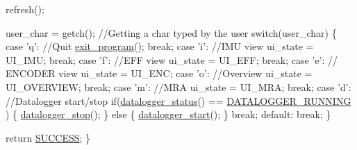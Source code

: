 \begin{DoxyCode}
        refresh();

        user\_char = getch(); \textcolor{comment}{//Getting a char typed by the user}
        \textcolor{keywordflow}{switch}(user\_char)
        \{
                \textcolor{keywordflow}{case} \textcolor{charliteral}{'q'}: \textcolor{comment}{//Quit}
                        \hyperlink{main2_8c_a5f05ce725141ddfab683e059b1cd95ea}{exit\_program}();
                        \textcolor{keywordflow}{break};
                \textcolor{keywordflow}{case} \textcolor{charliteral}{'i'}: \textcolor{comment}{//IMU view}
                        ui\_state = UI\_IMU;
                        \textcolor{keywordflow}{break};
                \textcolor{keywordflow}{case} \textcolor{charliteral}{'f'}: \textcolor{comment}{//EFF view}
                        ui\_state = UI\_EFF;
                        \textcolor{keywordflow}{break};
                \textcolor{keywordflow}{case} \textcolor{charliteral}{'e'}: \textcolor{comment}{// ENCODER view}
                        ui\_state = UI\_ENC;
                \textcolor{keywordflow}{case} \textcolor{charliteral}{'o'}: \textcolor{comment}{//Overview}
                        ui\_state = UI\_OVERVIEW;
                        \textcolor{keywordflow}{break};
                \textcolor{keywordflow}{case} \textcolor{charliteral}{'m'}: \textcolor{comment}{//MRA}
                        ui\_state = UI\_MRA;
                        \textcolor{keywordflow}{break};
                \textcolor{keywordflow}{case} \textcolor{charliteral}{'d'}: \textcolor{comment}{//Datalogger start/stop}
                  \textcolor{keywordflow}{if}(\hyperlink{datalogger_8c_a46fd1290d9ee97d5fc7171e1e0dcb0aa}{datalogger\_status}() == \hyperlink{datalogger_8h_a2cf92051a019c8ec1b5c4f5380758f62}{DATALOGGER\_RUNNING}
      )
                  \{
                    \hyperlink{datalogger_8c_aae2ffbc6cbf8f1cfecceb42c5139530a}{datalogger\_stop}();
                  \}
                  \textcolor{keywordflow}{else}
                  \{
                    \hyperlink{datalogger_8c_a1f254ef380d595d6605c10811fd0dee6}{datalogger\_start}();
                  \}
                  \textcolor{keywordflow}{break};
               \textcolor{keywordflow}{default}:
                 \textcolor{keywordflow}{break};
        \}

        \textcolor{keywordflow}{return} \hyperlink{calibration_2calibration_8h_aa90cac659d18e8ef6294c7ae337f6b58}{SUCCESS};
\}
\end{DoxyCode}


